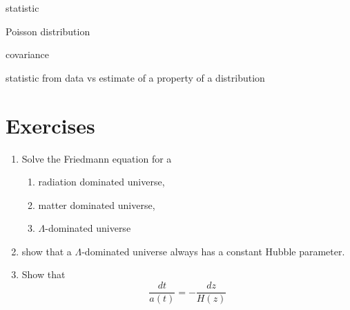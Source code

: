statistic

Poisson distribution



covariance

statistic from data vs estimate of a property of a distribution


\section{Exercises}

\begin{enumerate}
\item Solve the Friedmann equation for a
  \begin{enumerate}
  \item radiation dominated universe,
  \item matter dominated universe,
  \item $\Lambda$-dominated universe
  \end{enumerate}

\item show that a $\Lambda$-dominated universe always has a constant Hubble parameter.

\item Show that
  $$ \frac{dt}{a(t)} = - \frac{dz}{H(z)} $$

\end{enumerate}
